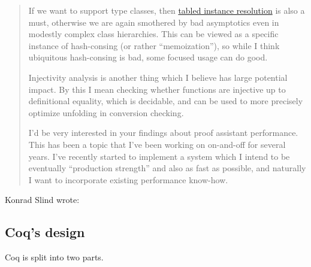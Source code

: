 \begin{subappendices}
\begin{minorcomment}
\begin{quotation}
If we want to support type classes, then \href{https://arxiv.org/pdf/2001.04301.pdf}{tabled instance resolution} \textcite{Tabled2020Selsam} is also a must, otherwise we are again smothered by bad asymptotics even in modestly complex class hierarchies. This can be viewed as a specific instance of hash-consing (or rather ``memoization''), so while I think ubiquitous hash-consing is bad, some focused usage can do good.

Injectivity analysis is another thing which I believe has large potential impact. By this I mean checking whether functions are injective up to definitional equality, which is decidable, and can be used to more precisely optimize unfolding in conversion checking.

I'd be very interested in your findings about proof assistant performance. This has been a topic that I've been working on on-and-off for several years. I've recently started to implement a system which I intend to be eventually ``production strength'' and also as fast as possible, and naturally I want to incorporate existing performance know-how.
\end{quotation}
\end{minorcomment}
\begin{minorcomment}
  Konrad Slind wrote:
\end{minorcomment}


\begin{minorcomment}
\section{Coq's design}
\end{minorcomment}
\begin{minorcomment}
Coq is split into two parts.


\end{minorcomment}
\end{subappendices}
